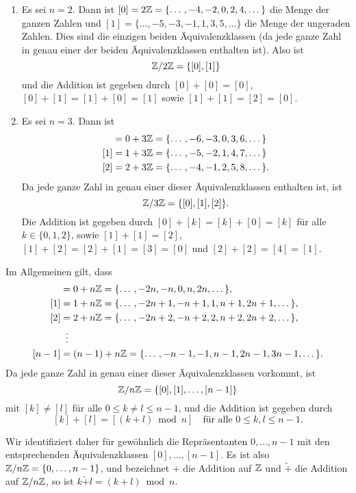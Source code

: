 \begin{bsp}
 \begin{enumerate}[label=\alph*),leftmargin=*]
  \item
   Es sei $n = 2$. Dann ist $[0] = 2\mathbb{Z} = \{\dotso, -4, -2, 0, 2, 4, \dotso\}$ die Menge der ganzen Zahlen und $[1] = \{\dotso, -5, -3, -1, 1, 3, 5, \dotso\}$ die Menge der ungeraden Zahlen. Dies sind die einzigen beiden Äquivalenzklassen (da jede ganze Zahl in genau einer der beiden Äquivalenzklassen enthalten ist). Also ist
   \[
    \mathbb{Z}/2\mathbb{Z} = \{[0], [1]\}
   \]
   und die Addition ist gegeben durch $[0] + [0] = [0]$, $[0] + [1] = [1] + [0] = [1]$ sowie $[1] + [1] = [2] = [0]$.
   
  \item
   Es sei $n = 3$. Dann ist
   \begin{align*}
    [0] &= 0+3\Zbb = \{\dotso, -6, -3, 0, 3, 6, \dotso\} \\
    [1] &= 1+3\Zbb = \{\dotso, -5, -2, 1, 4, 7, \dotso\} \\
    [2] &= 2+3\Zbb = \{\dotso, -4, -1, 2, 5, 8, \dotso\}.
   \end{align*}
   Da jede ganze Zahl in genau einer dieser Äquivalenzklassen enthalten ist, ist
   \[
    \mathbb{Z}/3\mathbb{Z} = \{[0], [1], [2]\}.
   \]
   Die Addition ist gegeben durch $[0] + [k] = [k] + [0] = [k]$ für alle $k \in \{0,1,2\}$, sowie $[1]+[1] = [2]$, $[1]+[2] = [2]+[1] = [3] = [0]$ und $[2]+[2] = [4] = [1]$.
 \end{enumerate}
\end{bsp}

Im Allgemeinen gilt, dass
\begin{align*}
 [0] &= 0+n\Zbb = \{\dotso, -2n, -n, 0, n, 2n, \dotso\}, \\
 [1] &= 1+n\Zbb = \{\dotso, -2n+1, -n+1, 1, n+1, 2n+1, \dotso\}, \\
 [2] &= 2+n\Zbb = \{\dotso, -2n+2, -n+2, 2, n+2, 2n+2, \dotso\}, \\
     &\;\;\vdots \\
 [n-1] &= (n-1)+n\Zbb = \{\dotso, -n-1, -1, n-1, 2n-1, 3n-1, \dotso\}.
\end{align*}
Da jede ganze Zahl in genau einer dieser Äquivalenzklassen vorkommt, ist
\[
 \mathbb{Z}/n\mathbb{Z} = \{[0], [1], \dotsc, [n-1]\}
\]
mit $[k] \neq [l]$ für alle $0 \leq k \neq l \leq n-1$, und die Addition ist gegeben durch
\[
 [k] + [l] = [(k+l) \bmod n]
 \quad
 \text{für alle $0 \leq k,l \leq n-1$}.
\]

Wir identifiziert daher für gewöhnlich die Repräsentanten $0, \dotsc, n-1$ mit den entsprechenden Äquivalenzklassen $[0], \dotsc, [n-1]$. Es ist also $\mathbb{Z}/n\mathbb{Z} = \{0, \dotsc, n-1\}$, und bezeichnet $+$ die Addition auf $\mathbb{Z}$ und $\tilde{+}$ die Addition auf $\mathbb{Z}/n\mathbb{Z}$, so ist $k \mathbin{\tilde{+}} l = (k+l) \bmod n$.


